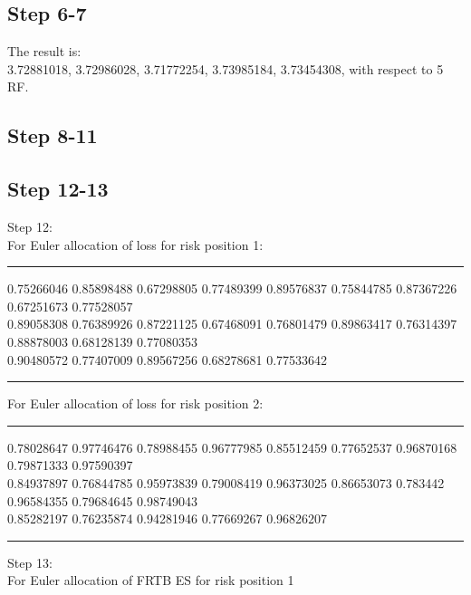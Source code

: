\documentclass{article}
\begin{document}
\subsection*{Step 6-7}
The result is:\\
3.72881018, 3.72986028, 3.71772254, 3.73985184, 3.73454308, with respect to 5 RF.

\subsection*{Step 8-11}
\subsection*{Step 12-13}
Step 12:\\
For Euler allocation of loss for risk position 1:\\
\hrule \vspace{5pt}
 0.75266046 0.85898488 0.67298805 0.77489399  
 0.89576837 0.75844785 0.87367226 0.67251673 0.77528057 \\
 0.89058308 0.76389926 0.87221125 0.67468091 0.76801479 
 0.89863417 0.76314397 0.88878003 0.68128139 0.77080353 \\
 0.90480572 0.77407009 0.89567256 0.68278681 0.77533642\\
\hrule \vspace{5pt}
\noindent For Euler allocation of loss for risk position 2:\\
\hrule \vspace{5pt}
 0.78028647 0.97746476 0.78988455 0.96777985  
 0.85512459 0.77652537 0.96870168 0.79871333 0.97590397 \\
 0.84937897 0.76844785 0.95973839 0.79008419 0.96373025 
 0.86653073 0.783442   0.96584355 0.79684645 0.98749043 \\
 0.85282197 0.76235874 0.94281946 0.77669267 0.96826207 \\
\hrule \vspace{5pt}
\vspace{15pt}
\noindent Step 13:\\
For Euler allocation of FRTB ES for risk position 1
\begin{table}[H]
\centering
  \label{tab:my-tab1}
  \end{table}
\end{document}
